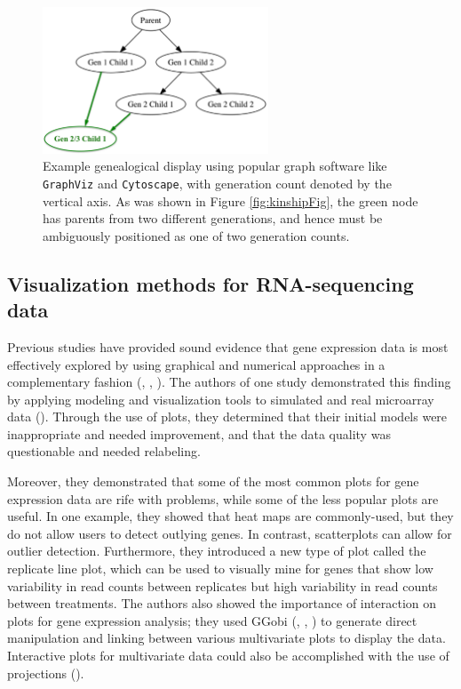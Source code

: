 \documentclass[11pt,a4paper,oldfontcommands,openany]{memoir}
\numberwithin{equation}{section} %
\newcommand{\pkg}[1]{{\texttt{#1}}}
\begin{document}
\begin{figure}[H]
    \begin{framed}
    \centering
    \includegraphics[width=0.6\textwidth]{Graph}
    \end{framed}
    \caption{Example genealogical display using popular graph software like \pkg{GraphViz} and \pkg{Cytoscape}, with generation count denoted by the vertical axis. As was shown in Figure \ref{fig:kinshipFig}, the green node has parents from two different generations, and hence must be ambiguously positioned as one of two generation counts.}
    \label{fig:Graph}
\end{figure}

\subsection{Visualization methods for RNA-sequencing data}

Previous studies have provided sound evidence that gene expression data is most effectively explored by using graphical and numerical approaches in a complementary fashion (\citealt{extra2}, \citealt{extra1}, \citealt{extra4}). The authors of one study demonstrated this finding by applying modeling and visualization tools to simulated and real microarray data (\citealt{jds}). Through the use of plots, they determined that their initial models were inappropriate and needed improvement, and that the data quality was questionable and needed relabeling.

Moreover, they demonstrated that some of the most common plots for gene expression data are rife with problems, while some of the less popular plots are useful. In one example, they showed that heat maps are commonly-used, but they do not allow users to detect outlying genes. In contrast, scatterplots can allow for outlier detection. Furthermore, they introduced a new type of plot called the replicate line plot, which can be used to visually mine for genes that show low variability in read counts between replicates but high variability in read counts between treatments. The authors also showed the importance of interaction on plots for gene expression analysis; they used GGobi (\citealt{ggobi}, \citealt{ggobi2}, \citealt{ggobi3}) to generate direct manipulation and linking between various multivariate plots to display the data. Interactive plots for multivariate data could also be accomplished with the use of projections (\citealt{extra3}).
\end{document}
